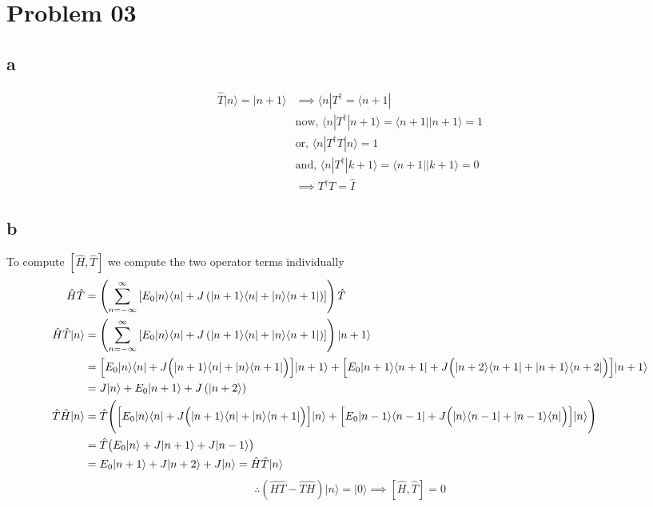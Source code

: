 \documentclass[letter]{article}
\begin{document}
\newpage
\section*{Problem 03} 

\subsection*{a} 
\begin{align*}
	\hat{T} | n \rangle  = | n+1 \rangle  &\implies \langle n | T^\dagger = \langle n+1 | \\ 
					      &\text{now, } \langle n | T^\dagger | n+1 \rangle = 
					      \langle n+1 | | n+1 \rangle  = 1 \\ 
					      &\text{or, } 
					      \langle n | T^\dagger T | n \rangle = 1 \\  
					      &\text{and, } \langle n | T^\dagger | k+1 \rangle = 
					      \langle n+1| | k+1 \rangle \tag{$n\neq k$ } = 0 
					   \\ & \implies T^\dagger T = \hat{I}
\end{align*}


\subsection*{b}
To compute $\left[ \hat{H}, \hat{T} \right] $ we compute the two operator terms individually
\begin{align*}
	\hat{H} \hat{T} &= 
\left(
\sum_{n=-\infty}^{\infty} 
\left[
E_0 | n \rangle \langle n | + 
J 
\left(
| n+1 \rangle \langle n | + 
| n \rangle \langle n+1 | 
\right)
\right] 
%
\right) 
\hat{T} 
\\ \hat{H} \hat{T} | n \rangle  &= 
\left(
\sum_{n=-\infty}^{\infty} 
\left[
E_0 | n \rangle \langle n | + 
J 
\left(
| n+1 \rangle \langle n | + 
| n \rangle \langle n+1 | 
\right)
\right] 
%
\right)  | n+1 \rangle 
\\ 
&= 
\Bigl[
E_0 | n \rangle  \langle n | + 
J \Bigl(
| n+1 \rangle \langle n | + 
| n \rangle \langle n+1 | 
\Bigr)
\Bigr] | n+1 \rangle  + 
%
\Bigl[
E_0 | n+1 \rangle \langle n+1 | + 
J \Bigl(
| n+2 \rangle \langle n+1 | + 
| n+1 \rangle \langle n+2 | 
\Bigr)
\Bigr] | n+1 \rangle  
\\
&= 
J | n \rangle + 
E_0 | n + 1\rangle  + 
J 
\left(
| n+2 \rangle 
\right)
\\
\hat{T}\hat{H} | n \rangle  &= 
\hat{T}\Biggr(
\Bigl[
E_0 | n \rangle  \langle n | + 
J \Bigl(
| n+1 \rangle \langle n | + 
| n \rangle \langle n+1 | 
\Bigr)
\Bigr] | n \rangle  + 
%
\Bigl[
E_0 | n-1 \rangle \langle n-1 | + 
J
\Bigl(
| n \rangle \langle n-1 | + | n-1 \rangle \langle n | 
	\Bigr)
\Bigr] | n \rangle 
\Biggr) \\ 
&= 
\hat{T} \bigl(
E_0 | n \rangle + J | n+1 \rangle + J | n-1 \rangle 
\bigr) \\ 
&= E_0 | n+1 \rangle + J | n+2 \rangle + J | n \rangle  = \hat{H} \hat{T} | n \rangle \\
\end{align*} 
\[
\therefore \left(\hat{H}\hat{T} - \hat{T}\hat{H}\right) | n \rangle  = | 0 \rangle  \implies
\left[
	\hat{H}, \hat{T} 
\right] = 0
\] 
\end{document}
